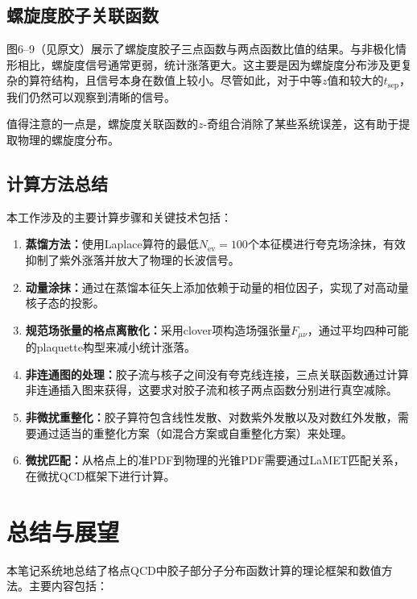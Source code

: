 \documentclass[12pt,a4paper]{ctexart}
\theoremstyle{definition}
\begin{document}
\subsection{螺旋度胶子关联函数}

图6--9（见原文）展示了螺旋度胶子三点函数与两点函数比值的结果。与非极化情形相比，螺旋度信号通常更弱，统计涨落更大。这主要是因为螺旋度分布涉及更复杂的算符结构，且信号本身在数值上较小。尽管如此，对于中等$z$值和较大的$t_{\text{sep}}$，我们仍然可以观察到清晰的信号。

值得注意的一点是，螺旋度关联函数的$z$-奇组合消除了某些系统误差，这有助于提取物理的螺旋度分布。

\subsection{计算方法总结}

本工作涉及的主要计算步骤和关键技术包括：

\begin{enumerate}
    \item \textbf{蒸馏方法：}使用Laplace算符的最低$N_{\text{ev}} = 100$个本征模进行夸克场涂抹，有效抑制了紫外涨落并放大了物理的长波信号。

    \item \textbf{动量涂抹：}通过在蒸馏本征矢上添加依赖于动量的相位因子，实现了对高动量核子态的投影。

    \item \textbf{规范场张量的格点离散化：}采用clover项构造场强张量$F_{\mu\nu}$，通过平均四种可能的plaquette构型来减小统计涨落。

    \item \textbf{非连通图的处理：}胶子流与核子之间没有夸克线连接，三点关联函数通过计算非连通插入图来获得，这要求对胶子流和核子两点函数分别进行真空减除。

    \item \textbf{非微扰重整化：}胶子算符包含线性发散、对数紫外发散以及对数红外发散，需要通过适当的重整化方案（如混合方案或自重整化方案）来处理。

    \item \textbf{微扰匹配：}从格点上的准PDF到物理的光锥PDF需要通过LaMET匹配关系，在微扰QCD框架下进行计算。
\end{enumerate}

\section{总结与展望}

本笔记系统地总结了格点QCD中胶子部分子分布函数计算的理论框架和数值方法。主要内容包括：
\end{document}
